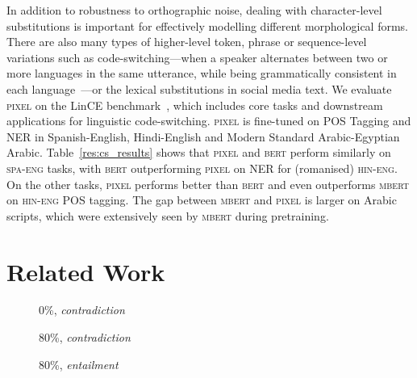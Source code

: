 \documentclass{article}
\newcommand{\model}{\textsc{pixel}\xspace}
\newcommand{\english}{\textsc{eng}\xspace}
\newcommand{\hindi}{\textsc{hin}\xspace}
\newcommand{\spanish}{\textsc{spa}\xspace}
\begin{document}
In addition to robustness to orthographic noise, dealing with character-level substitutions is important for effectively modelling different morphological forms.
There are also many types of higher-level token, phrase or sequence-level variations such as code-switching---when a speaker alternates between two or more languages in the same utterance, while being grammatically consistent in each language~\citep{joshi-1982-processing}---or the lexical substitutions in social media text.
We evaluate \model{} on the LinCE benchmark~\citep{aguilar-etal-2020-lince}, which includes core tasks and downstream applications for linguistic code-switching.
\model{} is fine-tuned on POS Tagging and NER in Spanish-English, Hindi-English and Modern Standard Arabic-Egyptian Arabic.
Table~\ref{res:cs_results} shows that \model{} and \textsc{bert} perform similarly on \spanish-\english tasks, with \textsc{bert} outperforming \model{} on NER for (romanised) \hindi-\english.
On the other tasks, \model{} performs better than \textsc{bert} and even outperforms \textsc{mbert} on \hindi-\english POS tagging. The gap between \textsc{mbert} and \model{} is larger on Arabic scripts, which were extensively seen by \textsc{mbert} during pretraining.

\vspace{-2mm}
\section{Related Work}
\label{sec:related_work}
\vspace{-2mm}

\begin{figure*}[!t]
    \centering
    \begin{subfigure}[]{0.31\textwidth}
        {\setlength{\fboxsep}{0pt}\setlength{\fboxrule}{1pt}}\caption{0\%, \emph{contradiction}}
    \end{subfigure}
    \quad
    \begin{subfigure}[]{0.31\textwidth}
        {\setlength{\fboxsep}{0pt}\setlength{\fboxrule}{1pt}}\caption{80\%, \emph{contradiction}}
    \end{subfigure}
    \quad
    \begin{subfigure}[]{0.31\textwidth}
        {\setlength{\fboxsep}{0pt}\setlength{\fboxrule}{1pt}}\caption{80\%, \emph{entailment}}
    \end{subfigure}
    \caption{Visual explanations of correct \model predictions (for classes \emph{contradiction} and \emph{entailment}) for NLI examples with 0\% and 80\% \textsc{confusable} substitutions using method by \cite{Chefer_2021_ICCV}, providing qualitative evidence for \model's robustness to character-level noise and the interpretability of its predictions.
    Red heatmap regions represent high relevancy.}
    \label{fig:pixel_interpretability}
    \vspace{-2mm}
\end{figure*}
\end{document}

